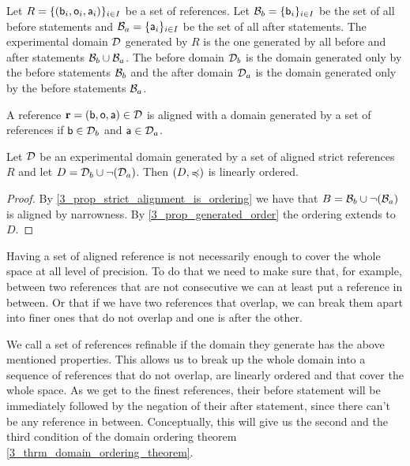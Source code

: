 \documentclass[11pt,letterpaper,fleqn]{memoir} %
\begin{document}
\begin{mathSection}

\begin{defn}
	Let $R = \{( \stmt[b]_i, \stmt[o]_i, \stmt[a]_i )\}_{i \in I}$ be a set of references. Let $\basis_b = \{\stmt[b]_i\}_{i \in I}$ be the set of all before statements and $\basis_a = \{\stmt[a]_i\}_{i \in I}$ be the set of all after statements. The experimental domain $\edomain$ generated by $R$ is the one generated by all before and after statements $\basis_b \cup \basis_a$. The before domain $\edomain_b$ is the domain generated only by the before statements $\basis_b$ and the after domain $\edomain_a$ is the domain generated only by the before statements $\basis_a$.
\end{defn}

\begin{defn}
	A reference $\refStmt = ( \stmt[b], \stmt[o], \stmt[a] ) \in \edomain$ is aligned with a domain generated by a set of references if $\stmt[b] \in \edomain_b$ and $\stmt[a] \in \edomain_a$.
\end{defn}

\begin{prop}\label{3_prop_basis_generate_ordering}
	Let $\edomain$ be an experimental domain generated by a set of aligned strict references $R$ and let $D=\edomain_b \cup \NOT (\edomain_a)$. Then $(D, \narrower)$ is linearly ordered.
\end{prop}
\begin{proof}
	By \ref{3_prop_strict_alignment_is_ordering} we have that $B = \basis_b \cup \NOT(\basis_a)$ is aligned by narrowness. By \ref{3_prop_generated_order} the ordering extends to $D$.
\end{proof}

\end{mathSection}

Having a set of aligned reference is not necessarily enough to cover the whole space at all level of precision. To do that we need to make sure that, for example, between two references that are not consecutive we can at least put a reference in between. Or that if we have two references that overlap, we can break them apart into finer ones that do not overlap and one is after the other.

We call a set of references refinable if the domain they generate has the above mentioned properties. This allows us to break up the whole domain into a sequence of references that do not overlap, are linearly ordered and that cover the whole space. As we get to the finest references, their before statement will be immediately followed by the negation of their after statement, since there can't be any reference in between. Conceptually, this will give us the second and the third condition of the domain ordering theorem \ref{3_thrm_domain_ordering_theorem}.
\end{document}
